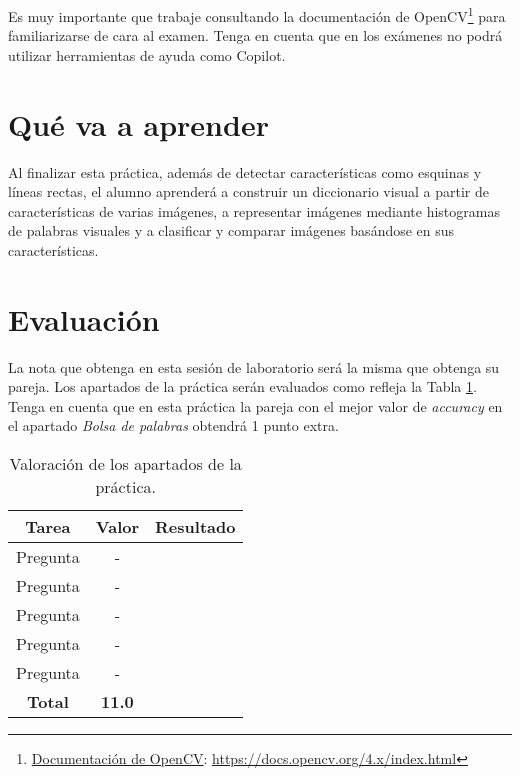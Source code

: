 Es muy importante que trabaje consultando la documentación de OpenCV\footnote{\href{https://docs.opencv.org/4.x/index.html}{Documentación de OpenCV}: \url{https://docs.opencv.org/4.x/index.html}} para familiarizarse de cara al examen. Tenga en cuenta que en los exámenes no podrá utilizar herramientas de ayuda como Copilot.

\section{Qué va a aprender}

Al finalizar esta práctica, además de detectar características como esquinas y líneas rectas, el alumno aprenderá a construir un diccionario visual a partir de características de varias imágenes, a representar imágenes mediante histogramas de palabras visuales y a clasificar y comparar imágenes basándose en sus características. 

\section{Evaluación}

La nota que obtenga en esta sesión de laboratorio será la misma que obtenga su pareja. Los apartados de la práctica serán evaluados como refleja la Tabla \ref{table:evaluacion}. Tenga en cuenta que en esta práctica la pareja con el mejor valor de \textit{accuracy} en el apartado \textit{Bolsa de palabras} obtendrá 1 punto extra.

\begin{table}[h!]
    \centering
    \begin{tabular}{|c|c|c|}
    \hline
    \textbf{Tarea} & \textbf{Valor} & \textbf{Resultado} \\
    \hline
    Pregunta & - & \\
    \hline
    Pregunta & - & \\
    \hline
    Pregunta & - & \\
    \hline
    Pregunta & - & \\
    \hline
    Pregunta & - & \\
    \hline
    \textbf{Total} & \textbf{11.0} & \\
    \hline
    \end{tabular}
    \caption{Valoración de los apartados de la práctica.}
    \label{table:evaluacion}
\end{table}
